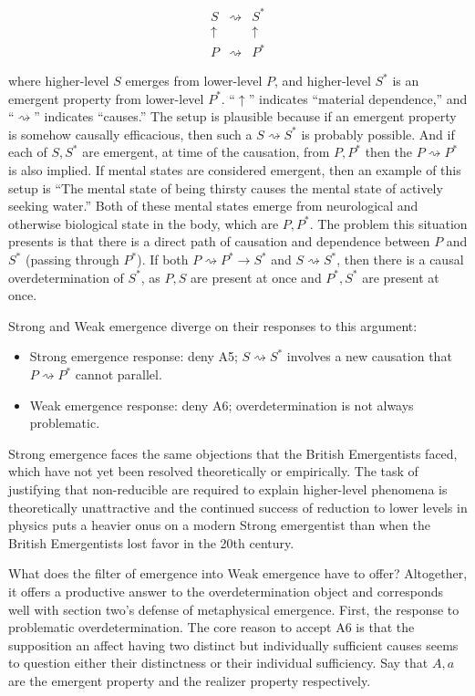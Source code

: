 \documentclass{article}
\begin{document}
\[\begin{array}{ccc}
    S & \rightsquigarrow & S^* \\
    \uparrow & & \uparrow \\
    P & \rightsquigarrow & P^*
\end{array}\]

where higher-level $S$ emerges from lower-level $P$, and higher-level $S^*$ is an emergent property from lower-level $P^*$. ``$\uparrow$'' indicates ``material dependence,'' and ``$\rightsquigarrow$'' indicates ``causes.'' The setup is plausible because if an emergent property is somehow causally efficacious, then such a $S \rightsquigarrow S^*$ is probably possible. And if each of $S, S^*$ are emergent, at time of the causation, from $P, P^*$ then the $P \rightsquigarrow P^*$ is also implied. If mental states are considered emergent, then an example of this setup is ``The mental state of being thirsty causes the mental state of actively seeking water.'' Both of these mental states emerge from neurological and otherwise biological state in the body, which are $P, P^*$. The problem this situation presents is that there is a direct path of causation and dependence between $P$ and $S^*$ (passing through $P^*$). If both $P \rightsquigarrow P^* \rightarrow S^*$ and $S \rightsquigarrow S^*$, then there is a causal overdetermination of $S^*$, as $P, S$ are present at once and $P^*, S^*$ are present at once.

Strong and Weak emergence diverge on their responses to this argument:

\begin{itemize}
    \item Strong emergence response: deny A5; $S \rightsquigarrow S^*$ involves a new causation that $P \rightsquigarrow P^*$ cannot parallel.
    \item Weak emergence response: deny A6; overdetermination is not always problematic.
\end{itemize}

Strong emergence faces the same objections that the British Emergentists faced, which have not yet been resolved theoretically or empirically. The task of justifying that non-reducible are required to explain higher-level phenomena is theoretically unattractive and the continued success of reduction to lower levels in physics puts a heavier onus on a modern Strong emergentist than when the British Emergentists lost favor in the 20th century.

What does the filter of emergence into Weak emergence have to offer? Altogether, it offers a productive answer to the overdetermination object and corresponds well with section two's defense of metaphysical emergence. First, the response to problematic overdetermination. The core reason to accept A6 is that the supposition an affect having two distinct but individually sufficient causes seems to question either their distinctness or their individual sufficiency. Say that $A, a$ are the emergent property and the realizer property respectively.
\end{document}
